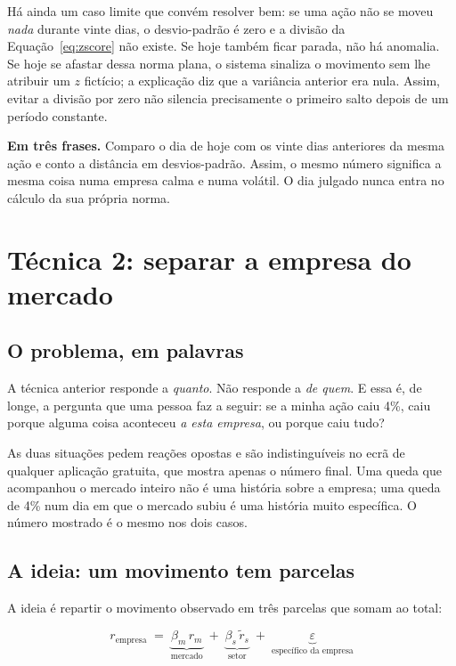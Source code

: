 Há ainda um caso limite que convém resolver bem: se uma ação não se moveu \emph{nada} durante
vinte dias, o desvio-padrão é zero e a divisão da Equação~\ref{eq:zscore} não existe. Se hoje também
ficar parada, não há anomalia. Se hoje se afastar dessa norma plana, o sistema sinaliza o movimento
sem lhe atribuir um $z$ fictício; a explicação diz que a variância anterior era nula. Assim, evitar
a divisão por zero não silencia precisamente o primeiro salto depois de um período constante.

\begin{tcolorbox}[colback=black!3, colframe=black!30, boxrule=0.4pt, arc=2pt]
\textbf{Em três frases.} Comparo o dia de hoje com os vinte dias anteriores da mesma ação e conto a
distância em desvios-padrão. Assim, o mesmo número significa a mesma coisa numa empresa calma e numa
volátil. O dia julgado nunca entra no cálculo da sua própria norma.
\end{tcolorbox}

\section{Técnica 2: separar a empresa do mercado}
\label{sec:met_decomposicao}

\subsection{O problema, em palavras}

A técnica anterior responde a \emph{quanto}. Não responde a \emph{de quem}. E essa é, de longe, a
pergunta que uma pessoa faz a seguir: se a minha ação caiu 4\%, caiu porque alguma coisa aconteceu
\emph{a esta empresa}, ou porque caiu tudo?

As duas situações pedem reações opostas e são indistinguíveis no ecrã de qualquer aplicação
gratuita, que mostra apenas o número final. Uma queda que acompanhou o mercado inteiro não é uma
história sobre a empresa; uma queda de 4\% num dia em que o mercado subiu é uma história muito
específica. O número mostrado é o mesmo nos dois casos.

\subsection{A ideia: um movimento tem parcelas}

A ideia é repartir o movimento observado em três parcelas que somam ao total:

\begin{equation}
r_{\text{empresa}} \;=\; \underbrace{\beta_m \, r_m}_{\text{mercado}}
\;+\; \underbrace{\beta_s \, \tilde r_s}_{\text{setor}}
\;+\; \underbrace{\varepsilon}_{\text{específico da empresa}}
\label{eq:decomposicao}
\end{equation}

